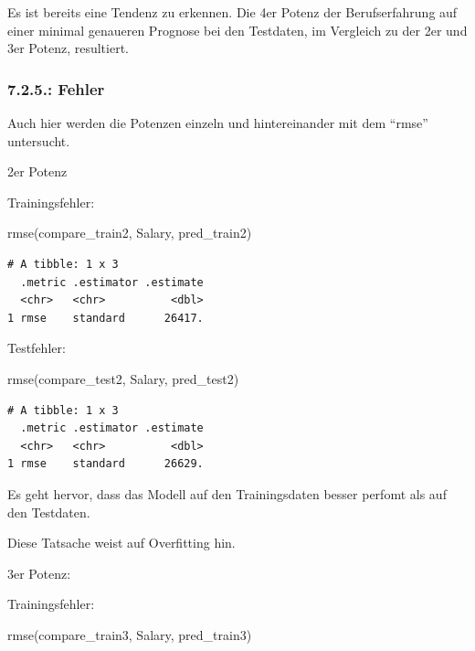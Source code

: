 \documentclass[
  letterpaper,
  DIV=11,
  numbers=noendperiod]{scrartcl}
\newenvironment{Shaded}{\begin{snugshade}}{\end{snugshade}}
\newcommand{\FunctionTok}[1]{\textcolor[rgb]{0.28,0.35,0.67}{#1}}
\newcommand{\NormalTok}[1]{\textcolor[rgb]{0.00,0.23,0.31}{#1}}
\begin{document}
Es ist bereits eine Tendenz zu erkennen. Die 4er Potenz der
Berufserfahrung auf einer minimal genaueren Prognose bei den Testdaten,
im Vergleich zu der 2er und 3er Potenz, resultiert.

\hypertarget{fehler-1}{%
\subsubsection{7.2.5.: Fehler}\label{fehler-1}}

Auch hier werden die Potenzen einzeln und hintereinander mit dem
``rmse'' untersucht.

2er Potenz

Trainingsfehler:

\begin{Shaded}
\begin{Highlighting}[]
\FunctionTok{rmse}\NormalTok{(compare\_train2, Salary, pred\_train2)}
\end{Highlighting}
\end{Shaded}

\begin{verbatim}
# A tibble: 1 x 3
  .metric .estimator .estimate
  <chr>   <chr>          <dbl>
1 rmse    standard      26417.
\end{verbatim}

Testfehler:

\begin{Shaded}
\begin{Highlighting}[]
\FunctionTok{rmse}\NormalTok{(compare\_test2, Salary, pred\_test2)}
\end{Highlighting}
\end{Shaded}

\begin{verbatim}
# A tibble: 1 x 3
  .metric .estimator .estimate
  <chr>   <chr>          <dbl>
1 rmse    standard      26629.
\end{verbatim}

Es geht hervor, dass das Modell auf den Trainingsdaten besser perfomt
als auf den Testdaten.

Diese Tatsache weist auf Overfitting hin.

3er Potenz:

Trainingsfehler:

\begin{Shaded}
\begin{Highlighting}[]
\FunctionTok{rmse}\NormalTok{(compare\_train3, Salary, pred\_train3)}
\end{Highlighting}
\end{Shaded}
\end{document}
